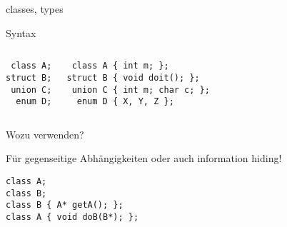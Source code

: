 \begin{frame}[fragile]{classes, types}
	\begin{block}{Syntax}
		\begin{columns}[t]
			\begin{lstlisting}
 class A;
struct B;
 union C;
  enum D;
			\end{lstlisting}
			
			\begin{lstlisting}
 class A { int m; };
struct B { void doit(); };
 union C { int m; char c; };
  enum D { X, Y, Z };
			\end{lstlisting}
		\end{columns}
	\end{block}
	
	\pause
	
	Wozu verwenden?
	\pause
	
	Für gegenseitige Abhängigkeiten oder auch information hiding!
	\begin{lstlisting}
class A;
class B;
class B { A* getA(); };
class A { void doB(B*); };
	\end{lstlisting}
\end{frame}

